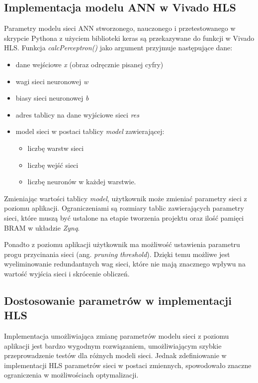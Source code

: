\subsection{Implementacja modelu ANN w Vivado HLS}
  Parametry modelu sieci ANN stworzonego, nauczonego i przetestowanego w skrypcie Pythona z użyciem biblioteki keras są przekazywane do funkcji w Vivado HLS. Funkcja \emph{calcPerceptron()} jako argument przyjmuje następujące dane:
  \begin{itemize}
    \item dane wejściowe \emph{x} (obraz odręcznie pisanej cyfry)
    \item wagi sieci neuronowej \emph{w}
    \item biasy sieci neuronowej \emph{b}
    \item adres tablicy na dane wyjściowe sieci \emph{res}
    \item model sieci w postaci tablicy \emph{model} zawierającej:
    \begin{itemize}
      \item liczbę warstw sieci
      \item liczbę wejść sieci
      \item liczbę neuronów w każdej warstwie.
    \end{itemize}
  \end{itemize}

Zmieniając wartości tablicy \emph{model}, użytkownik może zmieniać parametry sieci z poziomu 
aplikacji. Ograniczeniami są rozmiary tablic zawierających parametry sieci, które muszą być 
ustalone na etapie tworzenia projektu oraz ilość pamięci BRAM w układzie \emph{Zynq}.
   
Ponadto z poziomu aplikacji użytkownik ma możliwość ustawienia parametru progu przycinania sieci 
(ang. \emph{pruning threshold}). Dzięki temu możliwe jest wyeliminowanie redundantnych wag sieci, które nie mają znacznego wpływu na wartość wyjścia sieci i skrócenie obliczeń.

\subsection{Dostosowanie parametrów w implementacji HLS}

Implementacja umożliwiająca zmianę parametrów modelu sieci z poziomu aplikacji jest bardzo wygodnym 
rozwiązaniem, umożliwiającym szybkie przeprowadzenie testów dla różnych modeli sieci. Jednak 
zdefiniowanie w implementacji HLS parametrów sieci w postaci zmiennych, spowodowało znaczne 
ograniczenia w możliwościach optymalizacji. 

